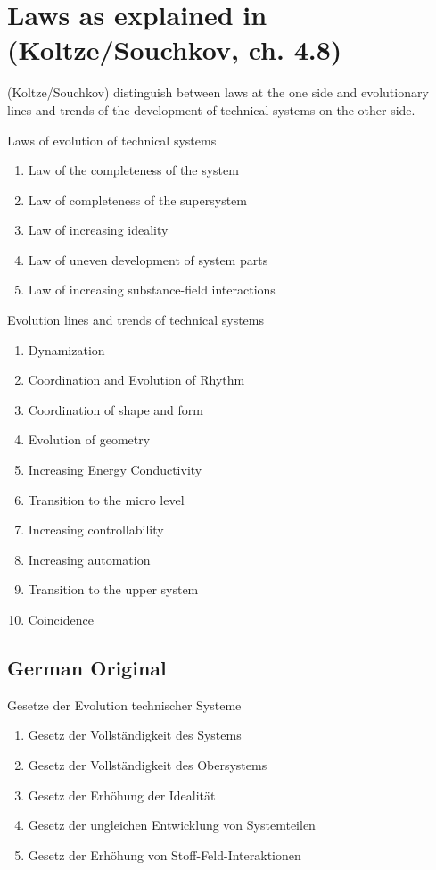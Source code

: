 \documentclass[11pt,a4paper]{article}
\begin{document}
\section*{Laws as explained in (Koltze/Souchkov, ch. 4.8)}

(Koltze/Souchkov) distinguish between laws at the one side and evolutionary
lines and trends of the development of technical systems on the other side.

Laws of evolution of technical systems
\begin{enumerate}\itemsep0pt
\item Law of the completeness of the system
\item Law of completeness of the supersystem
\item Law of increasing ideality
\item Law of uneven development of system parts
\item Law of increasing substance-field interactions
\end{enumerate}

Evolution lines and trends of technical systems
\begin{enumerate}\itemsep0pt
\item Dynamization
\item Coordination and Evolution of Rhythm
\item Coordination of shape and form
\item Evolution of geometry
\item Increasing Energy Conductivity
\item Transition to the micro level
\item Increasing controllability
\item Increasing automation
\item Transition to the upper system
\item Coincidence
\end{enumerate}

\subsection*{German Original}

Gesetze der Evolution technischer Systeme
\begin{enumerate}\itemsep0pt
\item Gesetz der Vollständigkeit des Systems
\item Gesetz der Vollständigkeit des Obersystems
\item Gesetz der Erhöhung der Idealität
\item Gesetz der ungleichen Entwicklung von Systemteilen
\item Gesetz der Erhöhung von Stoff-Feld-Interaktionen
\end{enumerate}
\end{document}
